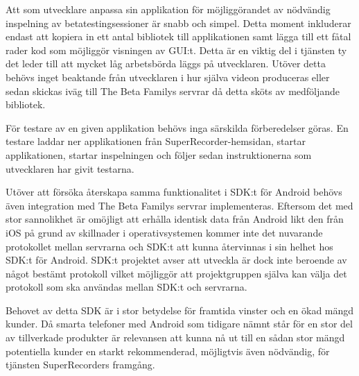 Att som utvecklare anpassa sin applikation för möjliggörandet av nödvändig inspelning av betatestingsessioner är snabb och simpel. Detta moment inkluderar endast att kopiera in ett antal bibliotek till applikationen samt lägga till ett fåtal rader kod som möjliggör visningen av GUI:t\parencite{https://thebetafamily.com/superrecorder/installation}. Detta är en viktig del i tjänsten ty det leder till att mycket låg arbetsbörda läggs på utvecklaren. Utöver detta behövs inget beaktande från utvecklaren i hur själva videon produceras eller sedan skickas iväg till The Beta Familys servrar då detta sköts av medföljande bibliotek. 

För testare av en given applikation behövs inga särskilda förberedelser göras. En testare laddar ner applikationen från SuperRecorder-hemsidan, startar applikationen, startar inspelningen och följer sedan instruktionerna som utvecklaren har givit testarna. 

Utöver att försöka återskapa samma funktionalitet i SDK:t för Android behövs även integration med The Beta Familys servrar implementeras. Eftersom det med stor sannolikhet är omöjligt att erhålla identisk data från Android likt den från iOS på grund av skillnader i operativsystemen kommer inte det nuvarande protokollet mellan servrarna och SDK:t att kunna återvinnas i sin helhet hos SDK:t för Android. SDK:t projektet avser att utveckla är dock inte beroende av något bestämt protokoll vilket möjliggör att projektgruppen själva kan välja det protokoll som ska användas mellan SDK:t och servrarna.

Behovet av detta SDK är i stor betydelse för framtida vinster och en ökad mängd kunder. Då smarta telefoner med Android som tidigare nämnt står för en stor del av tillverkade produkter är relevansen att kunna nå ut till en sådan stor mängd potentiella kunder en starkt rekommenderad, möjligtvis även nödvändig, för tjänsten SuperRecorders framgång.

